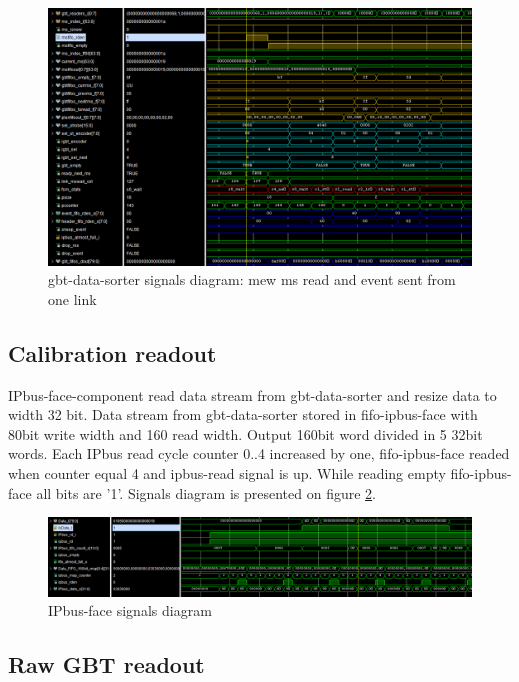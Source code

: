\documentclass{article}
\begin{document}
\begin{figure}[H]
	\centering 
	\includegraphics[width=1.0\textwidth]{gbt-sorter-waves.png}
	\caption{\label{fig:10} gbt-data-sorter signals diagram: mew ms read and event sent from one link }
\end{figure}



\subsection{Calibration readout}\label{sec:data-rd}
IPbus-face-component read data stream from gbt-data-sorter and resize data to width 32 bit. Data stream from gbt-data-sorter stored in fifo-ipbus-face with 80bit write width and 160 read width. Output 160bit word divided in 5 32bit words. Each IPbus read cycle counter 0..4 increased by one, fifo-ipbus-face readed when counter equal 4 and ipbus-read signal is up. While reading empty fifo-ipbus-face all bits are '1'. Signals diagram is presented on figure \ref{fig:11}.

\begin{figure}[H]
	\centering 
	\includegraphics[width=1.0\textwidth]{ipbus-face-waves.png}
	\caption{\label{fig:11} IPbus-face signals diagram }
\end{figure}



\subsection{Raw GBT readout}\label{sec:gbt-rd}
\end{document}
